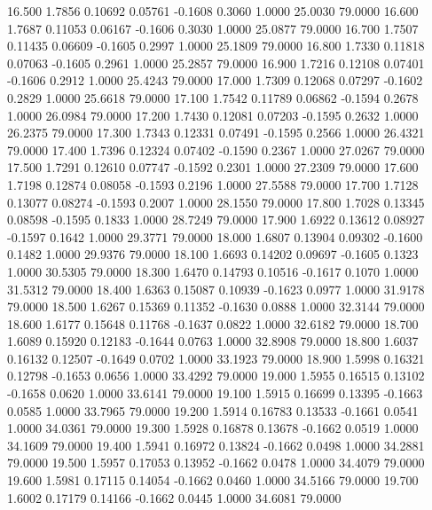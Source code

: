   16.500   1.7856   0.10692   0.05761  -0.1608   0.3060   1.0000  25.0030  79.0000
  16.600   1.7687   0.11053   0.06167  -0.1606   0.3030   1.0000  25.0877  79.0000
  16.700   1.7507   0.11435   0.06609  -0.1605   0.2997   1.0000  25.1809  79.0000
  16.800   1.7330   0.11818   0.07063  -0.1605   0.2961   1.0000  25.2857  79.0000
  16.900   1.7216   0.12108   0.07401  -0.1606   0.2912   1.0000  25.4243  79.0000
  17.000   1.7309   0.12068   0.07297  -0.1602   0.2829   1.0000  25.6618  79.0000
  17.100   1.7542   0.11789   0.06862  -0.1594   0.2678   1.0000  26.0984  79.0000
  17.200   1.7430   0.12081   0.07203  -0.1595   0.2632   1.0000  26.2375  79.0000
  17.300   1.7343   0.12331   0.07491  -0.1595   0.2566   1.0000  26.4321  79.0000
  17.400   1.7396   0.12324   0.07402  -0.1590   0.2367   1.0000  27.0267  79.0000
  17.500   1.7291   0.12610   0.07747  -0.1592   0.2301   1.0000  27.2309  79.0000
  17.600   1.7198   0.12874   0.08058  -0.1593   0.2196   1.0000  27.5588  79.0000
  17.700   1.7128   0.13077   0.08274  -0.1593   0.2007   1.0000  28.1550  79.0000
  17.800   1.7028   0.13345   0.08598  -0.1595   0.1833   1.0000  28.7249  79.0000
  17.900   1.6922   0.13612   0.08927  -0.1597   0.1642   1.0000  29.3771  79.0000
  18.000   1.6807   0.13904   0.09302  -0.1600   0.1482   1.0000  29.9376  79.0000
  18.100   1.6693   0.14202   0.09697  -0.1605   0.1323   1.0000  30.5305  79.0000
  18.300   1.6470   0.14793   0.10516  -0.1617   0.1070   1.0000  31.5312  79.0000
  18.400   1.6363   0.15087   0.10939  -0.1623   0.0977   1.0000  31.9178  79.0000
  18.500   1.6267   0.15369   0.11352  -0.1630   0.0888   1.0000  32.3144  79.0000
  18.600   1.6177   0.15648   0.11768  -0.1637   0.0822   1.0000  32.6182  79.0000
  18.700   1.6089   0.15920   0.12183  -0.1644   0.0763   1.0000  32.8908  79.0000
  18.800   1.6037   0.16132   0.12507  -0.1649   0.0702   1.0000  33.1923  79.0000
  18.900   1.5998   0.16321   0.12798  -0.1653   0.0656   1.0000  33.4292  79.0000
  19.000   1.5955   0.16515   0.13102  -0.1658   0.0620   1.0000  33.6141  79.0000
  19.100   1.5915   0.16699   0.13395  -0.1663   0.0585   1.0000  33.7965  79.0000
  19.200   1.5914   0.16783   0.13533  -0.1661   0.0541   1.0000  34.0361  79.0000
  19.300   1.5928   0.16878   0.13678  -0.1662   0.0519   1.0000  34.1609  79.0000
  19.400   1.5941   0.16972   0.13824  -0.1662   0.0498   1.0000  34.2881  79.0000
  19.500   1.5957   0.17053   0.13952  -0.1662   0.0478   1.0000  34.4079  79.0000
  19.600   1.5981   0.17115   0.14054  -0.1662   0.0460   1.0000  34.5166  79.0000
  19.700   1.6002   0.17179   0.14166  -0.1662   0.0445   1.0000  34.6081  79.0000

